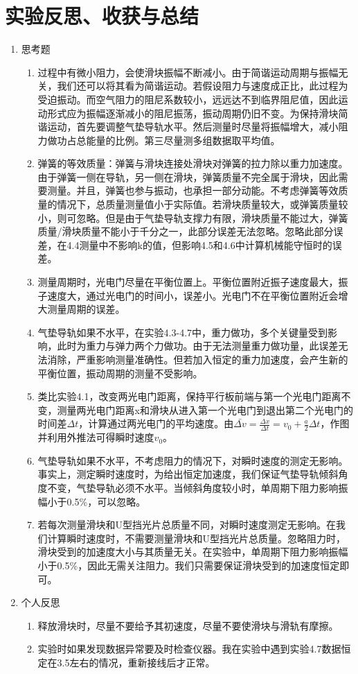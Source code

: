 \documentclass[11pt]{article}
\begin{document}
\section{实验反思、收获与总结}
\begin{enumerate}
    \item 思考题
    \begin{enumerate}
        \item 过程中有微小阻力，会使滑块振幅不断减小。由于简谐运动周期与振幅无关，我们还可以将其看为简谐运动。若假设阻力与速度成正比，此过程为受迫振动。而空气阻力的阻尼系数较小，远远达不到临界阻尼值，因此运动形式应为振幅逐渐减小的阻尼振荡，振动周期仍旧不变。为保持滑块简谐运动，首先要调整气垫导轨水平。然后测量时尽量将振幅增大，减小阻力做功占总能量的比例。第三尽量测多组数据取平均值。
        \item 弹簧的等效质量：弹簧与滑块连接处滑块对弹簧的拉力除以重力加速度。由于弹簧一侧在导轨，另一侧在滑块，弹簧质量不完全属于滑块，因此需要测量。并且，弹簧也参与振动，也承担一部分动能。不考虑弹簧等效质量的情况下，总质量测量值小于实际值。若滑块质量较大，或弹簧质量较小，则可忽略。但是由于气垫导轨支撑力有限，滑块质量不能过大，弹簧质量/滑块质量不能小于千分之一，此部分误差无法忽略。忽略此部分误差，在4.4测量中不影响k的值，但影响4.5和4.6中计算机械能守恒时的误差。
        \item 测量周期时，光电门尽量在平衡位置上。平衡位置附近振子速度最大，振子速度大，通过光电门的时间小，误差小。光电门不在平衡位置附近会增大测量周期的误差。
        \item 气垫导轨如果不水平，在实验4.3-4.7中，重力做功，多个关键量受到影响，此时为重力与弹力两个力做功。由于无法测量重力做功量，此误差无法消除，严重影响测量准确性。但若加入恒定的重力加速度，会产生新的平衡位置，振动周期的测量不受影响。
        \item 类比实验4.1，改变两光电门距离，保持平行板前端与第一个光电门距离不变，测量两光电门距离x和滑块从进入第一个光电门到退出第二个光电门的时间差$\Delta t$，计算通过两光电门的平均速度。由$\bar{\Delta v}=\frac{\Delta x}{\Delta t}=v_{0}+\frac{a}{2} \Delta t$，作图并利用外推法可得瞬时速度$v_{0}$。
        \item 气垫导轨如果不水平，不考虑阻力的情况下，对瞬时速度的测定无影响。事实上，测定瞬时速度时，为给出恒定加速度，我们保证气垫导轨倾斜角度不变，气垫导轨必须不水平。当倾斜角度较小时，单周期下阻力影响振幅小于0.5\%，可以忽略。
        \item 若每次测量滑块和U型挡光片总质量不同，对瞬时速度测定无影响。在我们计算瞬时速度时，不需要测量滑块和U型挡光片总质量。忽略阻力时，滑块受到的加速度大小与其质量无关。在实验中，单周期下阻力影响振幅小于0.5\%，因此无需关注阻力。我们只需要保证滑块受到的加速度恒定即可。
    \end{enumerate}
    \item 个人反思
    \begin{enumerate}
        \item 释放滑块时，尽量不要给予其初速度，尽量不要使滑块与滑轨有摩擦。
        \item 实验时如果发现数据异常要及时检查仪器。我在实验中遇到实验4.7数据恒定在3.5左右的情况，重新接线后才正常。
    \end{enumerate}
\end{enumerate}
\end{document}
